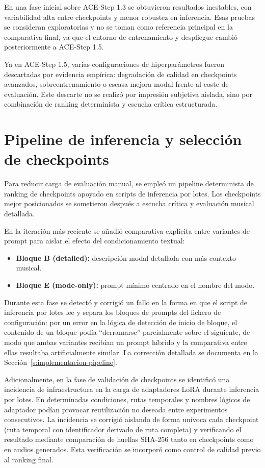 \documentclass[%
    school=etsisi,%
    type=pfg,%
    degree=61CD,%
]{upm-report}
\begin{document}
En una fase inicial sobre ACE-Step 1.3 se obtuvieron resultados inestables, con variabilidad alta entre checkpoints y menor robustez en inferencia. Esas pruebas se consideran exploratorias y no se toman como referencia principal en la comparativa final, ya que el entorno de entrenamiento y despliegue cambi\'o posteriormente a ACE-Step 1.5.

Ya en ACE-Step 1.5, varias configuraciones de hiperpar\'ametros fueron descartadas por evidencia emp\'irica: degradaci\'on de calidad en checkpoints avanzados, sobreentrenamiento o escasa mejora modal frente al coste de evaluaci\'on. Este descarte no se realiz\'o por impresi\'on subjetiva aislada, sino por combinaci\'on de ranking determinista y escucha cr\'itica estructurada.

\section{Pipeline de inferencia y selecci\'on de checkpoints}

Para reducir carga de evaluaci\'on manual, se emple\'o un pipeline determinista de ranking de checkpoints apoyado en scripts de inferencia por lotes. Los checkpoints mejor posicionados se sometieron despu\'es a escucha cr\'itica y evaluaci\'on musical detallada.

En la iteraci\'on m\'as reciente se a\~nadi\'o comparativa expl\'icita entre variantes de prompt para aislar el efecto del condicionamiento textual:

\begin{itemize}
    \item \textbf{Bloque B (detailed):} descripci\'on modal detallada con m\'as contexto musical.
    \item \textbf{Bloque E (mode-only):} prompt m\'inimo centrado en el nombre del modo.
\end{itemize}

Durante esta fase se detect\'o y corrigi\'o un fallo en la forma en que el script de inferencia por lotes lee y separa los bloques de prompts del fichero de configuraci\'on: por un error en la l\'ogica de detecci\'on de inicio de bloque, el contenido de un bloque pod\'ia ``derramarse'' parcialmente sobre el siguiente, de modo que ambas variantes recib\'ian un prompt h\'ibrido y la comparativa entre ellas resultaba artificialmente similar. La correcci\'on detallada se documenta en la Secci\'on~\ref{s:implementacion-pipeline}.

Adicionalmente, en la fase de validaci\'on de checkpoints se identific\'o una incidencia de infraestructura en la carga de adaptadores LoRA durante inferencia por lotes. En determinadas condiciones, rutas temporales y nombres l\'ogicos de adaptador pod\'ian provocar reutilizaci\'on no deseada entre experimentos consecutivos. La incidencia se corrigi\'o aislando de forma un\'ivoca cada checkpoint (ruta temporal con identificador derivado de ruta completa) y verificando el resultado mediante comparaci\'on de huellas SHA-256 tanto en checkpoints como en audios generados. Esta verificaci\'on se incorpor\'o como control de calidad previo al ranking final.
\end{document}
